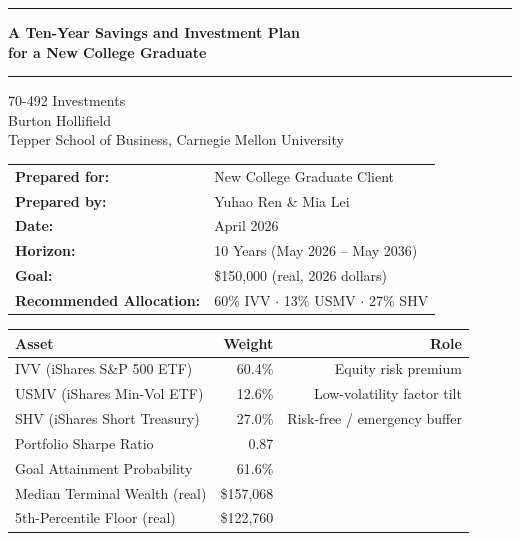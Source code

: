 \documentclass[12pt, letterpaper]{article}
\begin{document}

\begin{titlepage}
  \centering
  \vspace*{0.8cm}

  {\color{cmuRed}\rule{\linewidth}{2pt}}
  \vspace{0.5cm}

  {\LARGE\bfseries A Ten-Year Savings and Investment Plan\\[6pt]
   for a New College Graduate}

  \vspace{0.4cm}
  {\color{cmuRed}\rule{\linewidth}{0.8pt}}

  \vspace{1.2cm}

  {\large 70-492 Investments}\\[4pt]
  {\normalsize Burton Hollifield}\\[4pt]
  {\normalsize Tepper School of Business, Carnegie Mellon University}

  \vspace{1.4cm}

  \begin{tabular}{ll}
    \textbf{Prepared for:} & New College Graduate Client \\[4pt]
    \textbf{Prepared by:}  & Yuhao Ren \& Mia Lei \\[4pt]
    \textbf{Date:}         & April 2026 \\[4pt]
    \textbf{Horizon:}      & 10 Years (May 2026 -- May 2036) \\[4pt]
    \textbf{Goal:}         & \$150{,}000 (real, 2026 dollars) \\[4pt]
    \textbf{Recommended Allocation:} & 60\% IVV $\cdot$ 13\% USMV $\cdot$ 27\% SHV \\
  \end{tabular}

  \vspace{1.8cm}

  \begin{keybox}
    \centering
    \begin{tabular}{lrr}
      \toprule
      \textbf{Asset} & \textbf{Weight} & \textbf{Role} \\
      \midrule
      IVV (iShares S\&P 500 ETF)      & 60.4\% & Equity risk premium \\
      USMV (iShares Min-Vol ETF)      & 12.6\% & Low-volatility factor tilt \\
      SHV (iShares Short Treasury)    & 27.0\% & Risk-free / emergency buffer \\
      \midrule
      Portfolio Sharpe Ratio          & 0.87   & \\
      Goal Attainment Probability     & 61.6\% & \\
      Median Terminal Wealth (real)   & \$157{,}068 & \\
      5th-Percentile Floor (real)     & \$122{,}760 & \\
      \bottomrule
    \end{tabular}
  \end{keybox}


\end{titlepage}
\end{document}
